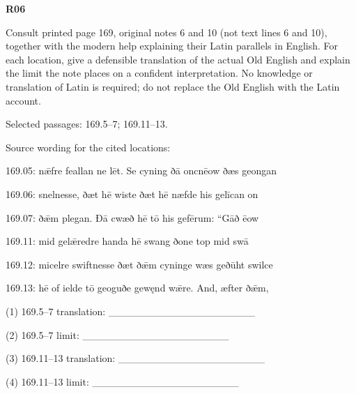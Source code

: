 \par\begin{minipage}{\linewidth}\raggedright
\textbf{R06}

Consult printed page 169, original notes 6 and 10 (not text lines 6 and 10), together with the modern help explaining their Latin parallels in English. For each location, give a defensible translation of the actual Old English and explain the limit the note places on a confident interpretation. No knowledge or translation of Latin is required; do not replace the Old English with the Latin account.

Selected passages: 169.5–7; 169.11–13.

Source wording for the cited locations:

169.05: nǣfre feallan ne lēt. Se cyning ðā oncnēow ðæs geongan

169.06: snelnesse, ðæt hē wiste ðæt hē næfde his gelīcan on

169.07: ðǣm plegan. Ðā cwæð hē tō his gefērum: “Gāð ēow

169.11: mid gelǣredre handa hē swang ðone top mid swā

169.12: micelre swiftnesse ðæt ðǣm cyninge wæs geðūht swilce

169.13: hē of ielde tō geoguðe gewęnd wǣre. And, æfter ðǣm,

(1) 169.5–7 translation: \_\_\_\_\_\_\_\_\_\_\_\_\_\_\_\_\_\_\_\_

(2) 169.5–7 limit: \_\_\_\_\_\_\_\_\_\_\_\_\_\_\_\_\_\_\_\_

(3) 169.11–13 translation: \_\_\_\_\_\_\_\_\_\_\_\_\_\_\_\_\_\_\_\_

(4) 169.11–13 limit: \_\_\_\_\_\_\_\_\_\_\_\_\_\_\_\_\_\_\_\_

\end{minipage}\par\addvspace{4pt}

